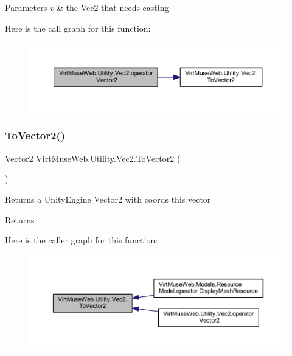 \begin{DoxyParams}{Parameters}
{\em v} & the \mbox{\hyperlink{class_virt_muse_web_1_1_utility_1_1_vec2}{Vec2}} that needs casting\\
\hline
\end{DoxyParams}
Here is the call graph for this function\+:
\nopagebreak
\begin{figure}[H]
\begin{center}
\leavevmode
\includegraphics[width=350pt]{class_virt_muse_web_1_1_utility_1_1_vec2_ae7eea094143341c9797862761fd1b6d9_cgraph}
\end{center}
\end{figure}
\mbox{\label{class_virt_muse_web_1_1_utility_1_1_vec2_adf9d148c0badd947b5655efbc24f560e}} 
\subsubsection{\texorpdfstring{To\+Vector2()}{ToVector2()}}
{\footnotesize\ttfamily Vector2 Virt\+Muse\+Web.\+Utility.\+Vec2.\+To\+Vector2 (\begin{DoxyParamCaption}{ }\end{DoxyParamCaption})}



Returns a Unity\+Engine Vector2 with coords this vector 

\begin{DoxyReturn}{Returns}

\end{DoxyReturn}
Here is the caller graph for this function\+:
\nopagebreak
\begin{figure}[H]
\begin{center}
\leavevmode
\includegraphics[width=350pt]{class_virt_muse_web_1_1_utility_1_1_vec2_adf9d148c0badd947b5655efbc24f560e_icgraph}
\end{center}
\end{figure}


